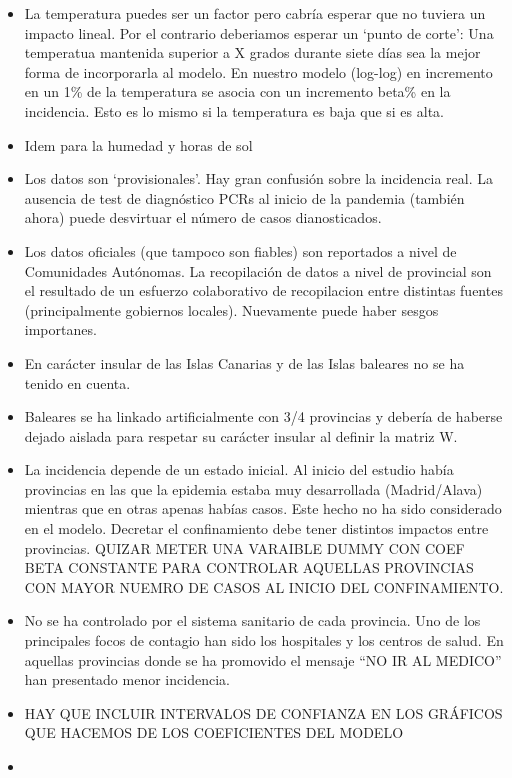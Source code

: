 \documentclass[]{elsarticle} %
\begin{document}
\begin{itemize}
\item
  La temperatura puedes ser un factor pero cabría esperar que no tuviera
  un impacto lineal. Por el contrario deberiamos esperar un `punto de
  corte': Una temperatua mantenida superior a X grados durante siete
  días sea la mejor forma de incorporarla al modelo. En nuestro modelo
  (log-log) en incremento en un 1\% de la temperatura se asocia con un
  incremento beta\% en la incidencia. Esto es lo mismo si la temperatura
  es baja que si es alta.
\item
  Idem para la humedad y horas de sol
\item
  Los datos son `provisionales'. Hay gran confusión sobre la incidencia
  real. La ausencia de test de diagnóstico PCRs al inicio de la pandemia
  (también ahora) puede desvirtuar el número de casos dianosticados.
\item
  Los datos oficiales (que tampoco son fiables) son reportados a nivel
  de Comunidades Autónomas. La recopilación de datos a nivel de
  provincial son el resultado de un esfuerzo colaborativo de
  recopilacion entre distintas fuentes (principalmente gobiernos
  locales). Nuevamente puede haber sesgos importanes.
\item
  En carácter insular de las Islas Canarias y de las Islas baleares no
  se ha tenido en cuenta.
\item
  Baleares se ha linkado artificialmente con 3/4 provincias y debería de
  haberse dejado aislada para respetar su carácter insular al definir la
  matriz W.
\item
  La incidencia depende de un estado inicial. Al inicio del estudio
  había provincias en las que la epidemia estaba muy desarrollada
  (Madrid/Alava) mientras que en otras apenas habías casos. Este hecho
  no ha sido considerado en el modelo. Decretar el confinamiento debe
  tener distintos impactos entre provincias. QUIZAR METER UNA VARAIBLE
  DUMMY CON COEF BETA CONSTANTE PARA CONTROLAR AQUELLAS PROVINCIAS CON
  MAYOR NUEMRO DE CASOS AL INICIO DEL CONFINAMIENTO.
\item
  No se ha controlado por el sistema sanitario de cada provincia. Uno de
  los principales focos de contagio han sido los hospitales y los
  centros de salud. En aquellas provincias donde se ha promovido el
  mensaje ``NO IR AL MEDICO'' han presentado menor incidencia.
\item
  HAY QUE INCLUIR INTERVALOS DE CONFIANZA EN LOS GRÁFICOS QUE HACEMOS DE
  LOS COEFICIENTES DEL MODELO
\item

\end{itemize}
\end{document}
